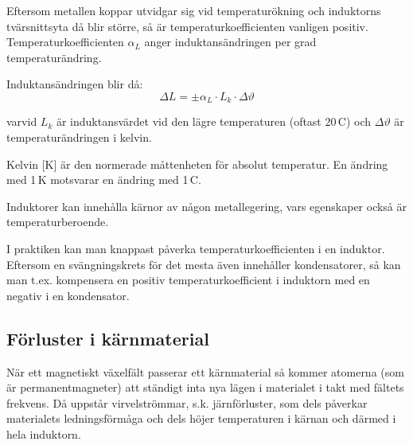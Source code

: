 Eftersom metallen koppar utvidgar sig vid temperaturökning och induktorns
tvärsnittsyta då blir större, så är temperaturkoefficienten vanligen positiv.
Temperaturkoefficienten \(\alpha_L\) anger induktansändringen per grad
temperaturändring.

Induktansändringen blir då:
\[\Delta L = \pm \alpha _L \cdot L_k \cdot \Delta\vartheta\]

varvid \(L_k\) är induktansvärdet vid den lägre temperaturen (oftast
20\degree\,C) och \(\Delta\vartheta\) är temperaturändringen i kelvin.

Kelvin [K] är den normerade måttenheten för absolut temperatur.
En ändring med 1\,K motsvarar en ändring med 1\degree\,C.

Induktorer kan innehålla kärnor av någon metallegering, vars egenskaper också är
temperaturberoende.

I praktiken kan man knappast påverka temperaturkoefficienten i en induktor.
Eftersom en svängningskrets för det mesta även innehåller kondensatorer, så kan
man t.ex. kompensera en positiv temperaturkoefficient i induktorn med en negativ
i en kondensator.

\subsection{Förluster i kärnmaterial}

När ett magnetiskt växelfält passerar ett kärnmaterial så kommer atomerna (som
är permanentmagneter) att ständigt inta nya lägen i materialet i takt med
fältets frekvens. Då uppstår virvelströmmar, s.k. järnförluster, som dels
påverkar materialets ledningsförmåga och dels höjer temperaturen i kärnan och
därmed i hela induktorn.
